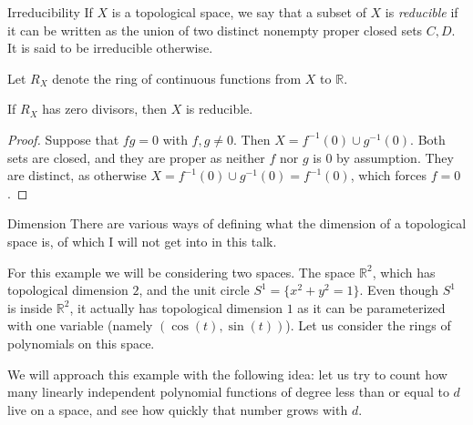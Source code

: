 \documentclass[aspectratio=169,10pt]{beamer}
\begin{document}
\begin{frame}{Irreducibility}
    If $X$ is a topological space, we say that a subset of $X$ is \textit{reducible} if it can be written as the union of two distinct nonempty proper closed sets $C,D$. It is said to be irreducible otherwise.

    Let $R_X$ denote the ring of continuous functions from $X$ to $\mathbb{R}$.
    \pause
    \begin{theorem}
        If $R_X$ has zero divisors, then $X$ is reducible.
    \end{theorem}

    \pause
    \begin{proof}
        Suppose that $fg=0$ with $f,g \neq 0$. Then $X = f^{-1}(0) \cup g^{-1}(0)$. Both sets are closed, and they are proper as neither $f$ nor $g$ is $0$ by assumption. They are distinct, as otherwise $X = f^{-1}(0) \cup g^{-1}(0) = f^{-1}(0)$, which forces $f = 0$.
    \end{proof}
\end{frame}


\begin{frame}{Dimension}
    There are various ways of defining what the dimension of a topological space is, of which I will not get into in this talk.
    \vspace{12pt}

    \pause
    For this example we will be considering two spaces. The space $\mathbb{R}^2$, which has topological dimension $2$, and the unit circle $S^1 = \{x^2+y^2=1\}$. Even though $S^1$ is inside $\mathbb{R}^2$, it actually has topological dimension $1$ as it can be parameterized with one variable (namely $(\cos(t), \sin(t))$). Let us consider the rings of polynomials on this space.
    \vspace{12pt}

    \pause
    We will approach this example with the following idea: let us try to count how many linearly independent polynomial functions of degree less than or equal to $d$ live on a space, and see how quickly that number grows with $d$.
\end{frame}
\end{document}
